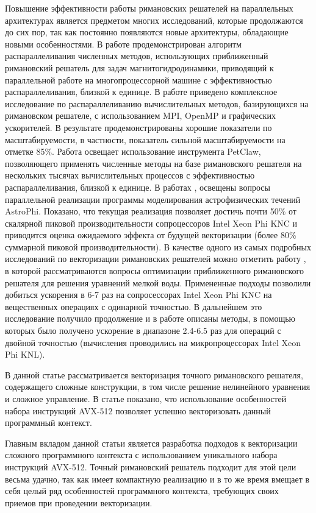 \documentclass[utf8]{psta}
\begin{document}
Повышение эффективности работы римановских решателей на параллельных архитектурах является предметом многих исследований, которые продолжаются до сих пор, так как постоянно появляются новые архитектуры, обладающие новыми особенностями.
В работе \cite{Shumlak} продемонстрирован алгоритм распараллеливания численных методов, использующих приближенный римановский решатель для задач магнитогидродинамики, приводящий к параллельной работе на многопроцессорной машине с эффективностью распараллеливания, близкой к единице.
В работе \cite{Schive} приведено комплексное исследование по распараллеливанию вычислительных методов, базирующихся на римановском решателе, с использованием MPI, OpenMP и графических ускорителей.
В результате продемонстрированы хорошие показатели по масштабируемости, в частности, показатель сильной масштабируемости на отметке 85\%.
Работа \cite{Mandli} освещает использование инструмента PetClaw, позволяющего применять численные методы на базе римановского решателя на нескольких тысячах вычислительных процессов с эффективностью распараллеливания, близкой к единице.
В работах \cite{Kulikov}, \cite{Kulikov2} освещены вопросы параллельной реализации программы моделирования астрофизических течений AstroPhi.
Показано, что текущая реализация позволяет достичь почти 50\% от скалярной пиковой производительности сопроцессоров Intel Xeon Phi KNC и приводится оценка ожидаемого эффекта от будущей векторизации (более 80\% суммарной пиковой производительности).
В качестве одного из самых подробных исследований по векторизации римановских решателей можно отметить работу \cite{BaderSWEVect}, в которой рассматриваются вопросы оптимизации приближенного римановского решателя для решения уравнений мелкой воды.
Примененные подходы позволили добиться ускорения в 6-7 раз на сопросессорах Intel Xeon Phi KNC на вещественных операциях с одинарной точностью.
В дальнейшем это исследование получило продолжение и в работе \cite{FerreiraSWEVect} описаны методы, в помощью которых было получено ускорение в диапазоне 2.4-6.5 раз для операций с двойной точностью (вычисления проводились на микропроцессорах Intel Xeon Phi KNL).

В данной статье рассматривается векторизация точного римановского решателя, содержащего сложные конструкции, в том числе решение нелинейного уравнения и сложное управление.
В статье показано, что использование особенностей набора инструкций AVX-512 позволяет успешно векторизовать данный программный контекст.

Главным вкладом данной статьи является разработка подходов к векторизации сложного программного контекста с использованием уникального набора инструкций AVX-512.
Точный римановский решатель подходит для этой цели весьма удачно, так как имеет компактную реализацию и в то же время вмещает в себя целый ряд особенностей программного контекста, требующих своих приемов при проведении векторизации.
\end{document}
